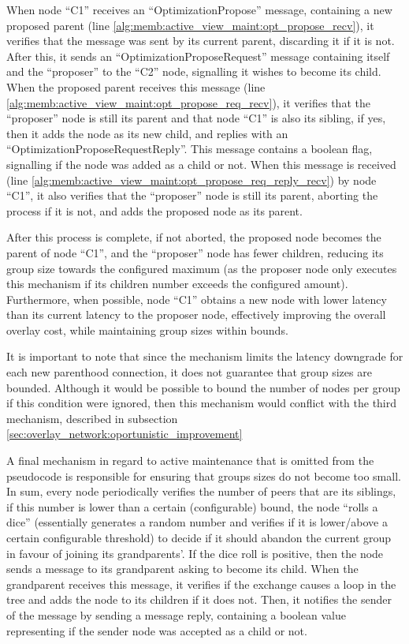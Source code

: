 When node ``C1'' receives an ``OptimizationPropose'' message, containing a new proposed parent (line \ref{alg:memb:active_view_maint:opt_propose_recv}), it verifies that the message was sent by its current parent, discarding it if it is not. After this, it sends an ``OptimizationProposeRequest'' message containing itself and the ``proposer'' to the ``C2'' node, signalling it wishes to become its child. When the proposed parent receives this message (line \ref{alg:memb:active_view_maint:opt_propose_req_recv}), it verifies that the ``proposer'' node is still its parent and that node ``C1'' is also its sibling, if yes, then it adds the node as its new child, and replies with an ``OptimizationProposeRequestReply''. This message contains a boolean flag, signalling if the node was added as a child or not. When this message is received (line \ref{alg:memb:active_view_maint:opt_propose_req_reply_recv}) by node ``C1'', it also verifies that the ``proposer'' node is still its parent, aborting the process if it is not, and adds the proposed node as its parent.

After this process is complete, if not aborted, the proposed node becomes the parent of node ``C1'', and the ``proposer'' node has fewer children, reducing its group size towards the configured maximum (as the proposer node only executes this mechanism if its children number exceeds the configured amount). Furthermore, when possible, node ``C1'' obtains a new node with lower latency than its current latency to the proposer node, effectively improving the overall overlay cost, while maintaining group sizes within bounds.

It is important to note that since the mechanism limits the latency downgrade for each new parenthood connection, it does not guarantee that group sizes are bounded. Although it would be possible to bound the number of nodes per group if this condition were ignored, then this mechanism would conflict with the third mechanism, described in subsection \ref{sec:overlay_network:oportunistic_improvement}

A final mechanism in regard to active maintenance that is omitted from the pseudocode is responsible for ensuring that groups sizes do not become too small. In sum, every node periodically verifies the number of peers that are its siblings, if this number is lower than a certain (configurable) bound, the node ``rolls a dice'' (essentially generates a random number and verifies if it is lower/above a certain configurable threshold) to decide if it should abandon the current group in favour of joining its grandparents'. If the dice roll is positive, then the node sends a message to its grandparent asking to become its child. When the grandparent receives this message, it verifies if the exchange causes a loop in the tree and adds the node to its children if it does not. Then, it notifies the sender of the message by sending a message reply, containing a boolean value representing if the sender node was accepted as a child or not. 

